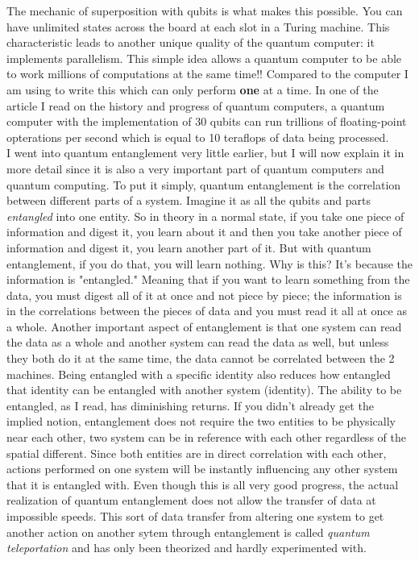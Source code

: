 \documentclass[11pt]{article}
\begin{document}
\indent The mechanic of superposition with qubits is what makes this possible. You can have unlimited states across the board at each slot in a Turing machine. This characteristic leads to another unique quality of the quantum computer: it implements parallelism. This simple idea allows a quantum computer to be able to work millions of computations at the same time!! Compared to the computer I am using to write this which can only perform \textbf{one} at a time. In one of the article I read on the history and progress of quantum computers, a quantum computer with the implementation of 30 qubits can run trillions of floating-point opterations per second which is equal to 10 teraflops of data being processed.\\
\indent I went into quantum entanglement very little earlier, but I will now explain it in more detail since it is also a very important part of quantum computers and quantum computing. To put it simply, quantum entanglement is the correlation between different parts of a system. Imagine it as all the qubits and parts \emph{entangled} into one entity. So in theory in a normal state, if you take one piece of information and digest it, you learn about it and then you take another piece of information and digest it, you learn another part of it. But with quantum entanglement, if you do that, you will learn nothing. Why is this? It's because the information is "entangled." Meaning that if you want to learn something from the data, you must digest all of it at once and not piece by piece; the information is in the correlations between the pieces of data and you must read it all at once as a whole. Another important aspect of entanglement is that one system can read the data as a whole and another system can read the data as well, but unless they both do it at the same time, the data cannot be correlated between the 2 machines. Being entangled with a specific identity also reduces how entangled that identity can be entangled with another system (identity). The ability to be entangled, as I read, has diminishing returns. If you didn't already get the implied notion, entanglement does not require the two entities to be physically near each other, two system can be in reference with each other regardless of the spatial different. Since both entities are in direct correlation with each other, actions performed on one system will be instantly influencing any other system that it is entangled with. Even though this is all very good progress, the actual realization of quantum entanglement does not allow the transfer of data at impossible speeds. This sort of data transfer from altering one system to get another action on another sytem through entanglement is called \emph{quantum teleportation} and has only been theorized and hardly experimented with.\\
\end{document}
